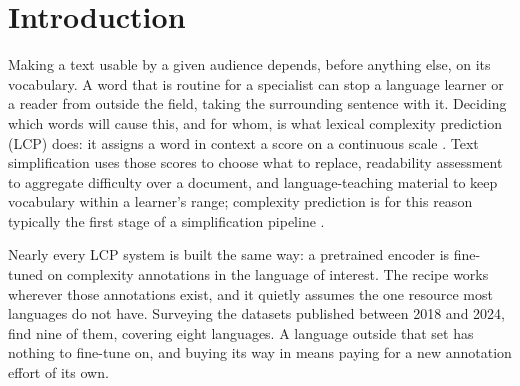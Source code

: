 %
%
%

\section{Introduction}
\label{section:intro}

Making a text usable by a given audience depends, before anything else,
on its vocabulary. A word that is routine for a specialist can stop a
language learner or a reader from outside the field, taking the
surrounding sentence with it. Deciding which
words will cause this, and for whom, is what lexical complexity
prediction (LCP) does: it assigns a word in context a score on a
continuous scale \citep{shardlow-etal-2021-semeval}. Text simplification
uses those scores to choose what to replace, readability assessment to
aggregate difficulty over a document, and language-teaching material to
keep vocabulary within a learner's range; complexity prediction is for
this reason typically the first stage of a simplification pipeline
\citep{qiu-etal-2024-complex}.

Nearly every LCP system is built the same way: a pretrained encoder is
fine-tuned on complexity annotations in the language of interest. The
recipe works wherever those annotations exist, and it quietly assumes the
one resource most languages do not have. Surveying the datasets published
between 2018 and 2024, \citet{shardlow-etal-2024-multilingual} find nine
of them, covering eight languages. A language outside that set has
nothing to fine-tune on, and buying its way in means paying for a new
annotation effort of its own.

